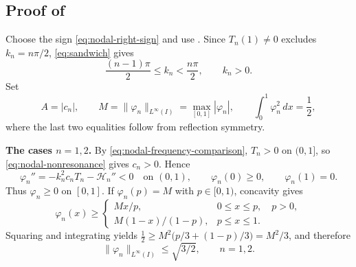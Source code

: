 \documentclass[11pt]{amsart}
\numberwithin{equation}{section}
\theoremstyle{remark}
\newcommand{\norm}[2][]{\lVert #2\rVert_{#1}}
\begin{document}
\subsection{Proof of }
\label{subsec:eigenfunction-bounds}

Choose the sign \eqref{eq:nodal-right-sign} and use
. Since $T_n(1)\ne0$ excludes
$k_n=n\pi/2$, \eqref{eq:sandwich} gives
\begin{equation}\label{eq:nodal-frequency-comparison}
 \frac{(n-1)\pi}{2}\le k_n<\frac{n\pi}{2},\qquad k_n>0.
\end{equation}
Set
\[
 A=|c_n|,\qquad
 M=\norm[L^\infty(I)]{\varphi_n}=\max_{[0,1]}|\varphi_n|,
 \qquad \int_0^1\varphi_n^2\,dx=\frac12,
\]
where the last two equalities follow from reflection symmetry.

\medskip\noindent\textbf{The cases $n=1,2$.}
By \eqref{eq:nodal-frequency-comparison}, $T_n>0$ on $(0,1]$,
so \eqref{eq:nodal-nonresonance} gives $c_n>0$. Hence
\[
 \varphi_n''=-k_n^2c_nT_n-\mathcal H_n''<0\quad\text{on }(0,1),
 \qquad \varphi_n(0)\ge0,\qquad\varphi_n(1)=0.
\]
Thus $\varphi_n\ge0$ on $[0,1]$. If $\varphi_n(p)=M$ with
$p\in[0,1)$, concavity gives
\[
 \varphi_n(x)\ge
 \begin{cases}
 Mx/p,&0\le x\le p,\quad p>0,\\
 M(1-x)/(1-p),&p\le x\le1.
 \end{cases}
\]
Squaring and integrating yields
$\tfrac12\ge M^2\bigl(p/3+(1-p)/3\bigr)=M^2/3$, and therefore
\begin{equation}\label{eq:first-two-Linfty}
 \norm[L^\infty(I)]{\varphi_n}\le\sqrt{3/2},\qquad n=1,2.
\end{equation}
\end{document}
